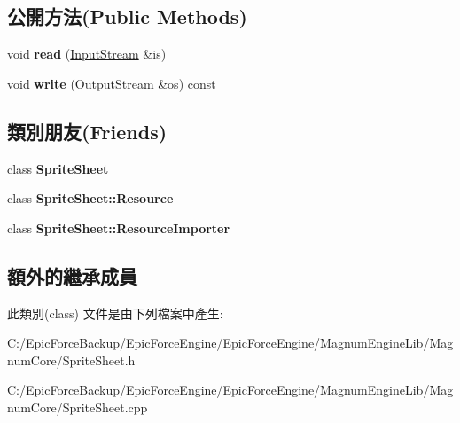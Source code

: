 \subsection*{公開方法(Public Methods)}
\begin{DoxyCompactItemize}
\item 
void {\bfseries read} (\hyperlink{class_magnum_1_1_input_stream}{Input\+Stream} \&is)\hypertarget{class_magnum_1_1_sprite_sheet_1_1_quad_a5c348e9fbe412c4d9c16b40816c06eec}{}\label{class_magnum_1_1_sprite_sheet_1_1_quad_a5c348e9fbe412c4d9c16b40816c06eec}

\item 
void {\bfseries write} (\hyperlink{class_magnum_1_1_output_stream}{Output\+Stream} \&os) const \hypertarget{class_magnum_1_1_sprite_sheet_1_1_quad_a5318c4eff65c038dde605dbd5e9a966f}{}\label{class_magnum_1_1_sprite_sheet_1_1_quad_a5318c4eff65c038dde605dbd5e9a966f}

\end{DoxyCompactItemize}
\subsection*{類別朋友(Friends)}
\begin{DoxyCompactItemize}
\item 
class {\bfseries Sprite\+Sheet}\hypertarget{class_magnum_1_1_sprite_sheet_1_1_quad_ab43118917ba092ba6289c7ee4cd3e5fd}{}\label{class_magnum_1_1_sprite_sheet_1_1_quad_ab43118917ba092ba6289c7ee4cd3e5fd}

\item 
class {\bfseries Sprite\+Sheet\+::\+Resource}\hypertarget{class_magnum_1_1_sprite_sheet_1_1_quad_a8727041c910f9527ea7b20dfac74f485}{}\label{class_magnum_1_1_sprite_sheet_1_1_quad_a8727041c910f9527ea7b20dfac74f485}

\item 
class {\bfseries Sprite\+Sheet\+::\+Resource\+Importer}\hypertarget{class_magnum_1_1_sprite_sheet_1_1_quad_a3c6baee866d2819736b4c0a94c9e507c}{}\label{class_magnum_1_1_sprite_sheet_1_1_quad_a3c6baee866d2819736b4c0a94c9e507c}

\end{DoxyCompactItemize}
\subsection*{額外的繼承成員}


此類別(class) 文件是由下列檔案中產生\+:\begin{DoxyCompactItemize}
\item 
C\+:/\+Epic\+Force\+Backup/\+Epic\+Force\+Engine/\+Epic\+Force\+Engine/\+Magnum\+Engine\+Lib/\+Magnum\+Core/Sprite\+Sheet.\+h\item 
C\+:/\+Epic\+Force\+Backup/\+Epic\+Force\+Engine/\+Epic\+Force\+Engine/\+Magnum\+Engine\+Lib/\+Magnum\+Core/Sprite\+Sheet.\+cpp\end{DoxyCompactItemize}
